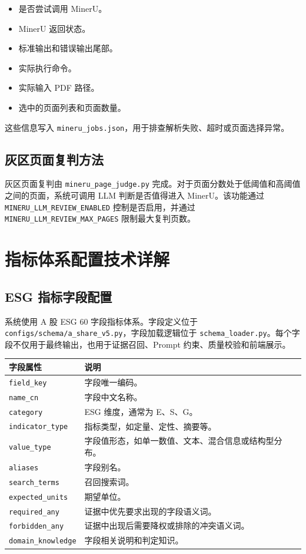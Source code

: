 \documentclass[UTF8,a4paper,12pt]{ctexart}
\newenvironment{manualtable}[1]{%
  \small
  \begin{longtable}{#1}
}{%
  \end{longtable}
  \normalsize
}
\begin{document}
\begin{itemize}
  \item 是否尝试调用 MinerU。
  \item MinerU 返回状态。
  \item 标准输出和错误输出尾部。
  \item 实际执行命令。
  \item 实际输入 PDF 路径。
  \item 选中的页面列表和页面数量。
\end{itemize}

这些信息写入 \texttt{mineru\_jobs.json}，用于排查解析失败、超时或页面选择异常。

\subsection{灰区页面复判方法}

灰区页面复判由 \texttt{mineru\_page\_judge.py} 完成。对于页面分数处于低阈值和高阈值之间的页面，系统可调用 LLM 判断是否值得进入 MinerU。该功能通过 \texttt{MINERU\_LLM\_REVIEW\_ENABLED} 控制是否启用，并通过 \texttt{MINERU\_LLM\_REVIEW\_MAX\_PAGES} 限制最大复判页数。

\section{指标体系配置技术详解}

\subsection{ESG 指标字段配置}

系统使用 A 股 ESG 60 字段指标体系。字段定义位于 \texttt{configs/schema/a\_share\_v5.py}，字段加载逻辑位于 \texttt{schema\_loader.py}。每个字段不仅用于最终输出，也用于证据召回、Prompt 约束、质量校验和前端展示。

\begin{manualtable}{p{4cm}p{10cm}}
\toprule
\textbf{字段属性} & \textbf{说明} \\
\midrule
\endhead
\texttt{field\_key} & 字段唯一编码。 \\
\texttt{name\_cn} & 字段中文名称。 \\
\texttt{category} & ESG 维度，通常为 E、S、G。 \\
\texttt{indicator\_type} & 指标类型，如定量、定性、摘要等。 \\
\texttt{value\_type} & 字段值形态，如单一数值、文本、混合信息或结构型分布。 \\
\texttt{aliases} & 字段别名。 \\
\texttt{search\_terms} & 召回搜索词。 \\
\texttt{expected\_units} & 期望单位。 \\
\texttt{required\_any} & 证据中优先要求出现的字段语义词。 \\
\texttt{forbidden\_any} & 证据中出现后需要降权或排除的冲突语义词。 \\
\texttt{domain\_knowledge} & 字段相关说明和判定知识。 \\
\bottomrule
\end{manualtable}
\end{document}
